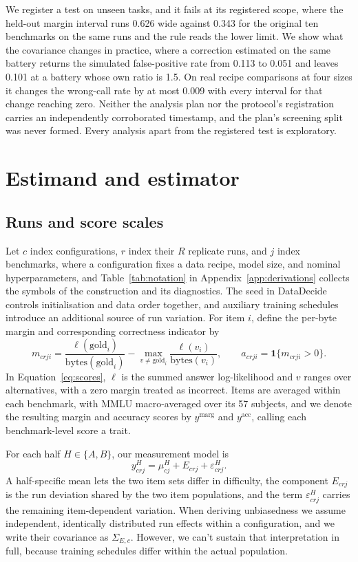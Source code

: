 \documentclass{article}
\begin{document}
We register a test on unseen tasks, and it fails at its registered scope, where the held-out margin interval runs 0.626 wide against 0.343 for the original ten benchmarks on the same runs and the rule reads the lower limit. We show what the covariance changes in practice, where a correction estimated on the same battery returns the simulated false-positive rate from 0.113 to 0.051 and leaves 0.101 at a battery whose own ratio is 1.5. On real recipe comparisons at four sizes it changes the wrong-call rate by at most 0.009 with every interval for that change reaching zero. Neither the analysis plan nor the protocol's registration carries an independently corroborated timestamp, and the plan's screening split was never formed. Every analysis apart from the registered test is exploratory.

\section{Estimand and estimator}
\label{sec:estimator}
\subsection{Runs and score scales}
Let $c$ index configurations, $r$ index their $R$ replicate runs, and $j$ index benchmarks, where a configuration fixes a data recipe, model size, and nominal hyperparameters, and Table~\ref{tab:notation} in Appendix~\ref{app:derivations} collects the symbols of the construction and its diagnostics. The seed in DataDecide controls initialisation and data order together, and auxiliary training schedules introduce an additional source of run variation. For item $i$, define the per-byte margin and corresponding correctness indicator by
\begin{equation}
m_{crji}=\frac{\ell(\mathrm{gold}_i)}{\mathrm{bytes}(\mathrm{gold}_i)}-
\max_{v\ne\mathrm{gold}_i}\frac{\ell(v_i)}{\mathrm{bytes}(v_i)},
\qquad a_{crji}=\mathbf{1}\{m_{crji}>0\}.
\label{eq:scores}
\end{equation}
In Equation~\ref{eq:scores}, $\ell$ is the summed answer log-likelihood and $v$ ranges over alternatives, with a zero margin treated as incorrect. Items are averaged within each benchmark, with MMLU macro-averaged over its 57 subjects, and we denote the resulting margin and accuracy scores by $y^{\mathrm{marg}}$ and $y^{\mathrm{acc}}$, calling each benchmark-level score a trait.

For each half $H\in\{A,B\}$, our measurement model is
\begin{equation}
y^H_{crj}=\mu^H_{cj}+E_{crj}+\varepsilon^H_{crj}.
\end{equation}
A half-specific mean lets the two item sets differ in difficulty, the component $E_{crj}$ is the run deviation shared by the two item populations, and the term $\varepsilon^H_{crj}$ carries the remaining item-dependent variation. When deriving unbiasedness we assume independent, identically distributed run effects within a configuration, and we write their covariance as $\Sigma_{E,c}$. However, we can't sustain that interpretation in full, because training schedules differ within the actual population.
\end{document}
